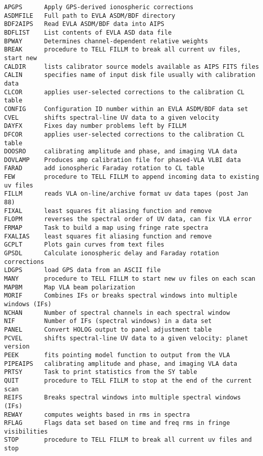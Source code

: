 \vskip 0.5pt
\bbve\begin{verbatim}
APGPS      Apply GPS-derived ionospheric corrections
ASDMFILE   Full path to EVLA ASDM/BDF directory
BDF2AIPS   Read EVLA ASDM/BDF data into AIPS
BDFLIST    List contents of EVLA ASD data file
BPWAY      Determines channel-dependent relative weights
BREAK      procedure to TELL FILLM to break all current uv files, start new
CALDIR     lists calibrator source models available as AIPS FITS files
CALIN      specifies name of input disk file usually with calibration data
CLCOR      applies user-selected corrections to the calibration CL table
CONFIG     Configuration ID number within an EVLA ASDM/BDF data set
CVEL       shifts spectral-line UV data to a given velocity
DAYFX      Fixes day number problems left by FILLM
DFCOR      applies user-selected corrections to the calibration CL table
DOOSRO     calibrating amplitude and phase, and imaging VLA data
DOVLAMP    Produces amp calibration file for phased-VLA VLBI data
FARAD      add ionospheric Faraday rotation to CL table
FEW        procedure to TELL FILLM to append incoming data to existing uv files
FILLM      reads VLA on-line/archive format uv data tapes (post Jan 88)
FIXAL      least squares fit aliasing function and remove
FLOPM      reverses the spectral order of UV data, can fix VLA error
FRMAP      Task to build a map using fringe rate spectra
FXALIAS    least squares fit aliasing function and remove
GCPLT      Plots gain curves from text files
GPSDL      Calculate ionospheric delay and Faraday rotation corrections
LDGPS      load GPS data from an ASCII file
MANY       procedure to TELL FILLM to start new uv files on each scan
MAPBM      Map VLA beam polarization
MORIF      Combines IFs or breaks spectral windows into multiple windows (IFs)
NCHAN      Number of spectral channels in each spectral window
NIF        Number of IFs (spectral windows) in a data set
PANEL      Convert HOLOG output to panel adjustment table
PCVEL      shifts spectral-line UV data to a given velocity: planet version
PEEK       fits pointing model function to output from the VLA
PIPEAIPS   calibrating amplitude and phase, and imaging VLA data
PRTSY      Task to print statistics from the SY table
QUIT       procedure to TELL FILLM to stop at the end of the current scan
REIFS      Breaks spectral windows into multiple spectral windows (IFs)
REWAY      computes weights based in rms in spectra
RFLAG      Flags data set based on time and freq rms in fringe visibilities
STOP       procedure to TELL FILLM to break all current uv files and stop

\end{verbatim}
